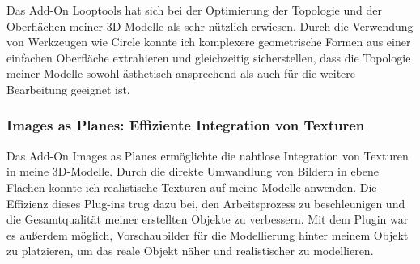 Das Add-On Looptools hat sich bei der Optimierung der Topologie und der Oberflächen meiner 3D-Modelle als sehr nützlich
erwiesen. Durch die Verwendung von Werkzeugen wie Circle konnte ich komplexere geometrische Formen aus einer einfachen Oberfläche
extrahieren und gleichzeitig sicherstellen, dass die Topologie meiner Modelle sowohl ästhetisch ansprechend als auch für die weitere
Bearbeitung geeignet ist.

\subsubsection{Images as Planes: Effiziente Integration von Texturen}

Das Add-On Images as Planes ermöglichte die nahtlose Integration von Texturen in meine 3D-Modelle. Durch die direkte
Umwandlung von Bildern in ebene Flächen konnte ich realistische Texturen auf meine Modelle anwenden. Die Effizienz dieses
Plug-ins trug dazu bei, den Arbeitsprozess zu beschleunigen und die Gesamtqualität meiner erstellten Objekte zu verbessern.
Mit dem Plugin war es außerdem möglich, Vorschaubilder für die Modellierung hinter meinem Objekt zu platzieren, um das
reale Objekt näher und realistischer zu modellieren.

